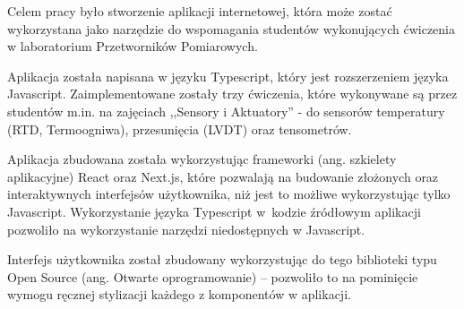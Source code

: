 Celem pracy było stworzenie aplikacji internetowej, która może zostać
wykorzystana jako narzędzie do wspomagania studentów wykonujących ćwiczenia w laboratorium
Przetworników Pomiarowych.

Aplikacja została napisana w języku Typescript, który jest rozszerzeniem języka Javascript.
Zaimplementowane zostały trzy ćwiczenia, które wykonywane są przez studentów m.in. na zajęciach
,,Sensory i Aktuatory'' - do sensorów temperatury (RTD, Termoogniwa), przesunięcia (LVDT) oraz
tensometrów.

Aplikacja zbudowana została wykorzystując frameworki (ang. szkielety aplikacyjne) React oraz
Next.js, które pozwalają na budowanie złożonych oraz interaktywnych interfejsów
użytkownika, niż jest to możliwe wykorzystując tylko Javascript. Wykorzystanie języka Typescript
w~kodzie źródłowym aplikacji pozwoliło na wykorzystanie narzędzi niedostępnych w Javascript.

Interfejs użytkownika został zbudowany wykorzystując do tego biblioteki typu Open Source
(ang. Otwarte oprogramowanie) -- pozwoliło to na pominięcie wymogu ręcznej stylizacji każdego z
komponentów w aplikacji.
